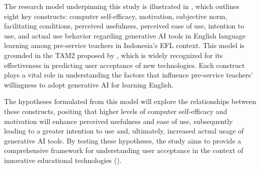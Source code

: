 \documentclass[english]{textolivre}
\begin{document}
The research model underpinning this study is illustrated in , which outlines eight key constructs: computer self-efficacy, motivation, subjective norm, facilitating conditions, perceived usefulness, perceived ease of use, intention to use, and actual use behavior regarding generative AI tools in English language learning among pre-service teachers in Indonesia’s EFL context. This model is grounded in the TAM2 proposed by \textcite{VenkateshDavis2000TAMExtension}, which is widely recognized for its effectiveness in predicting user acceptance of new technologies. Each construct plays a vital role in understanding the factors that influence pre-service teachers’ willingness to adopt generative AI for learning English.

The hypotheses formulated from this model will explore the relationships between these constructs, positing that higher levels of computer self-efficacy and motivation will enhance perceived usefulness and ease of use, subsequently leading to a greater intention to use and, ultimately, increased actual usage of generative AI tools. By testing these hypotheses, the study aims to provide a comprehensive framework for understanding user acceptance in the context of innovative educational technologies ().
\end{document}
